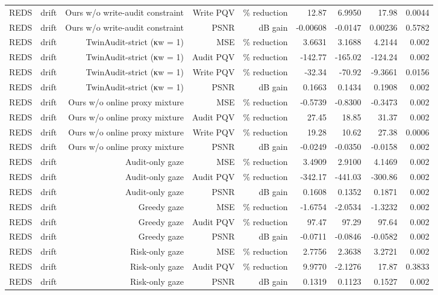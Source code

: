 \begin{table}[t]
\begin{tabular}{llrrrrrrr}
REDS & drift & Ours w/o write-audit constraint & Write PQV & \% reduction & 12.87 & 6.9950 & 17.98 & 0.0044 \\
REDS & drift & Ours w/o write-audit constraint & PSNR & dB gain & -0.00608 & -0.0147 & 0.00236 & 0.5782 \\
REDS & drift & TwinAudit-strict (κw = 1) & MSE & \% reduction & 3.6631 & 3.1688 & 4.2144 & 0.002 \\
REDS & drift & TwinAudit-strict (κw = 1) & Audit PQV & \% reduction & -142.77 & -165.02 & -124.24 & 0.002 \\
REDS & drift & TwinAudit-strict (κw = 1) & Write PQV & \% reduction & -32.34 & -70.92 & -9.3661 & 0.0156 \\
REDS & drift & TwinAudit-strict (κw = 1) & PSNR & dB gain & 0.1663 & 0.1434 & 0.1908 & 0.002 \\
REDS & drift & Ours w/o online proxy mixture & MSE & \% reduction & -0.5739 & -0.8300 & -0.3473 & 0.002 \\
REDS & drift & Ours w/o online proxy mixture & Audit PQV & \% reduction & 27.45 & 18.85 & 31.37 & 0.002 \\
REDS & drift & Ours w/o online proxy mixture & Write PQV & \% reduction & 19.28 & 10.62 & 27.38 & 0.0006 \\
REDS & drift & Ours w/o online proxy mixture & PSNR & dB gain & -0.0249 & -0.0350 & -0.0158 & 0.002 \\
REDS & drift & Audit-only gaze & MSE & \% reduction & 3.4909 & 2.9100 & 4.1469 & 0.002 \\
REDS & drift & Audit-only gaze & Audit PQV & \% reduction & -342.17 & -441.03 & -300.86 & 0.002 \\
REDS & drift & Audit-only gaze & PSNR & dB gain & 0.1608 & 0.1352 & 0.1871 & 0.002 \\
REDS & drift & Greedy gaze & MSE & \% reduction & -1.6754 & -2.0534 & -1.3232 & 0.002 \\
REDS & drift & Greedy gaze & Audit PQV & \% reduction & 97.47 & 97.29 & 97.64 & 0.002 \\
REDS & drift & Greedy gaze & PSNR & dB gain & -0.0711 & -0.0846 & -0.0582 & 0.002 \\
REDS & drift & Risk-only gaze & MSE & \% reduction & 2.7756 & 2.3638 & 3.2721 & 0.002 \\
REDS & drift & Risk-only gaze & Audit PQV & \% reduction & 9.9770 & -2.1276 & 17.87 & 0.3833 \\
REDS & drift & Risk-only gaze & PSNR & dB gain & 0.1319 & 0.1123 & 0.1527 & 0.002 \\

\end{tabular}
\end{table}
